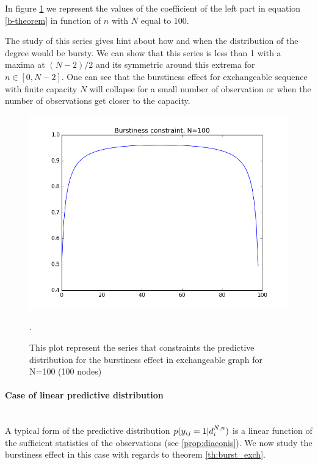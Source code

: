 In figure \ref{fig:bp} we represent the values of the coefficient of the left part in equation \eqref{b-theorem} in function of $n$ with $N$ equal to 100.
	
The study of this series gives hint about how and when the distribution of the degree would be bursty. We can show that this series is less than 1 with a maxima at $(N-2)/2$ and its symmetric around this extrema for $n \in [0, N-2]$. One can see that the burstiness effect for exchangeable sequence with finite capacity $N$ will collapse for a small number of observation or when the number of observations get closer to the capacity.
	
	\begin{figure}[h]
		\centering
		\includegraphics[scale=0.4]{img/bp}
		\caption{This plot represent the series that constraints the predictive distribution for the burstiness effect in exchangeable graph for N=100 (100 nodes)}.
		\label{fig:bp}
	\end{figure}



\paragraph{Case of linear predictive distribution}~\\

A typical form of the predictive distribution $p(y_{ij}=1 | d_i^{N,n})$ is a linear function of the sufficient statistics of the observations (see \ref{prop:diaconis}). We now study the burstiness effect in this case with regards to theorem \ref{th:burst_exch}.

